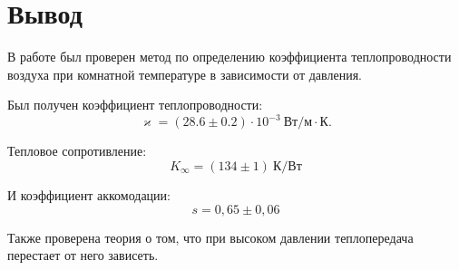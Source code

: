 \documentclass[a4paper,12pt]{article}
\theoremstyle{definition}
\begin{document}
	\section{Вывод}
	
	В работе был проверен метод по определению коэффициента теплопроводности воздуха при комнатной температуре в зависимости от давления.
	
	Был получен коэффициент теплопроводности:
	\begin{equation*}
		\varkappa  =  (28.6\pm0.2)\cdot 10^{-3}\: \text{Вт}/\text{м}\cdot\text{К}.
	\end{equation*}

	Тепловое сопротивление:
	\begin{equation*}
		K_\infty = (134 \pm 1)\:\text{К}/\text{Вт}
	\end{equation*}

	И коэффициент аккомодации:
	\begin{equation*}
		s = 0,65 \pm 0,06
	\end{equation*}
	
	Также проверена теория о том, что при высоком давлении теплопередача перестает от него зависеть.
	
\end{document}
